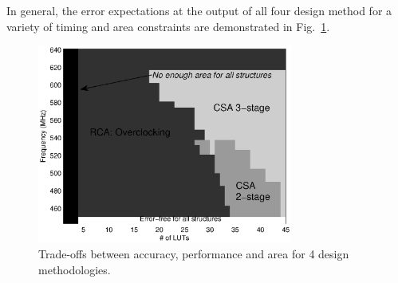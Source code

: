 \documentclass[journal]{IEEEtran}
\begin{document}
In general, the error expectations at the output of all four design method for a variety of timing and area constraints are demonstrated in Fig.~\ref{Tradeoff}.
\begin{figure}[htbp]
  \centering
  \includegraphics[width=3.3in]{./Figures/Tradeoff.eps}
  \caption{Trade-offs between accuracy, performance and area for 4 design methodologies.}
  \label{Tradeoff}
\end{figure}


%
%

\end{document}
